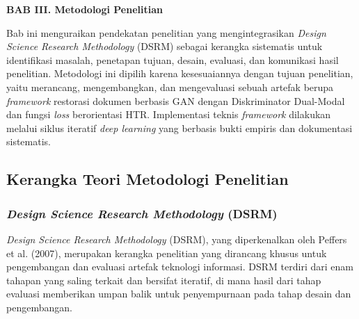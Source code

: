 \documentclass[12pt,a4paper]{article}
\begin{document}
\sloppy

\vspace{2cm}
\begin{center}
{\fontsize{14}{16.8}\selectfont\textbf{BAB III. Metodologi Penelitian}}\\[1em]
\end{center}
\label{sec:metodologi}
\setcounter{section}{3}
\setcounter{subsection}{0}
\vspace{2em}

Bab ini menguraikan pendekatan penelitian yang mengintegrasikan \textit{Design Science Research Methodology} (DSRM) sebagai kerangka sistematis untuk identifikasi masalah, penetapan tujuan, desain, evaluasi, dan komunikasi hasil penelitian. Metodologi ini dipilih karena kesesuaiannya dengan tujuan penelitian, yaitu merancang, mengembangkan, dan mengevaluasi sebuah artefak berupa \textit{framework} restorasi dokumen berbasis GAN dengan Diskriminator Dual-Modal dan fungsi \textit{loss} berorientasi HTR. Implementasi teknis \textit{framework} dilakukan melalui siklus iteratif \textit{deep learning} yang berbasis bukti empiris dan dokumentasi sistematis.
\vspace{1em}

\subsection{Kerangka Teori Metodologi Penelitian}
\label{subsec:kerangka-teori}
\vspace{0.8em}

\subsubsection{\textit{Design Science Research Methodology} (DSRM)}
\textit{Design Science Research Methodology} (DSRM), yang diperkenalkan oleh Peffers et al. (2007), merupakan kerangka penelitian yang dirancang khusus untuk pengembangan dan evaluasi artefak teknologi informasi. DSRM terdiri dari enam tahapan yang saling terkait dan bersifat iteratif, di mana hasil dari tahap evaluasi memberikan umpan balik untuk penyempurnaan pada tahap desain dan pengembangan.
\end{document}
